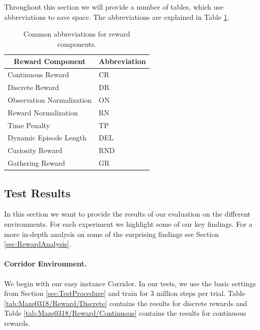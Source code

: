 Throughout this section we will provide a number of tables, which use abbreviations to save space. The abbreviations are explained in Table \ref{tab:RewardAbbreviations}.  

\begin{table} [ht]
    \begin{center}
        \begin{tabular}{ll}
            \toprule
            \multicolumn{1}{c}{Reward Component} & Abbreviation \\
            \midrule
            Continuous Reward & CR \\
            Discrete Reward & DR \\
            Observation Normalization & ON \\
            Reward Normalization & RN \\
            Time Penalty & TP \\
            Dynamic Episode Length & DEL \\
            Curiosity Reward & RND \\
            Gathering Reward & GR \\
            \bottomrule
        \end{tabular}
    \end{center}
    \caption[Abbreviations for Reward Components]{Common abbreviations for reward components.} \label{tab:RewardAbbreviations}
\end{table}


\subsection{Test Results} \label{sec:RewardTestResults}
In this section we want to provide the results of our evaluation on the different environments. For each experiment we highlight some of our key findings. For a more in-depth analysis on some of the surprising findings see Section \ref{sec:RewardAnalysis}.

\paragraph{Corridor Environment.}
We begin with our easy instance Corridor. In our tests, we use the basic settings from Section \ref{sec:TestProcedure} and train for 3 million steps per trial. Table \ref{tab:Maze0318/Reward/Discrete} contains the results for discrete rewards and Table \ref{tab:Maze0318/Reward/Continuous} contains the results for continuous rewards.

